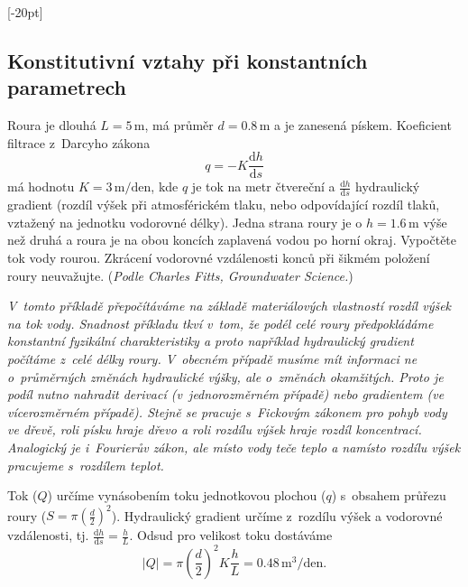 \konec



[-20pt]
\subsection{Konstitutivní vztahy při konstantních parametrech}

Roura je dlouhá $L=5\,\mathrm m$, má průměr $d=0.8\,\mathrm m$ a je zanesená pískem. Koeficient filtrace z Darcyho zákona
\begin{equation*}
  q=-K\frac{\mathrm dh}{\mathrm ds}
\end{equation*}
má hodnotu $K=3\,\mathrm m/\mathrm{den}$, kde $q$ je tok na metr čtvereční a $\frac{\mathrm dh}{\mathrm ds}$ hydraulický gradient (rozdíl výšek při atmosférickém tlaku, nebo odpovídající rozdíl tlaků, vztažený na jednotku vodorovné délky). Jedna strana roury je o $h=1.6\,\mathrm{m}$ výše než druhá a roura je na obou koncích zaplavená vodou po horní okraj. Vypočtěte tok vody rourou. Zkrácení vodorovné vzdálenosti konců při šikmém položení roury neuvažujte.
(\textit{Podle Charles Fitts, Groundwater Science.})


{\textit{V tomto příkladě přepočítáváme na základě materiálových vlastností rozdíl výšek na tok vody. Snadnost příkladu tkví v tom, že podél celé roury předpokládáme konstantní fyzikální charakteristiky a proto například hydraulický gradient počítáme z celé délky roury. V obecném případě musíme mít informaci ne o průměrných změnách hydraulické výšky, ale o změnách okamžitých. Proto je podíl nutno nahradit derivací (v jednorozměrném případě) nebo gradientem (ve vícerozměrném případě). Stejně se pracuje s Fickovým zákonem pro pohyb vody ve dřevě, roli písku hraje dřevo a roli rozdílu výšek hraje rozdíl koncentrací. Analogický je i Fourierův zákon, ale místo vody teče teplo a namísto rozdílu výšek pracujeme s rozdílem teplot.}

}

\reseni
Tok ($Q$) určíme vynásobením toku jednotkovou plochou ($q$) s obsahem průřezu roury ($S=\pi \left(\frac d2\right)^2$). Hydraulický gradient určíme z rozdílu výšek a vodorovné vzdálenosti, tj. $\frac{\mathrm dh}{\mathrm ds}=\frac hL.$ Odsud pro velikost toku dostáváme
$$|Q|= \pi \left(\frac d2\right)^2 K \frac hL=0.48 \,\mathrm{m}^3/\mathrm{den}.$$
\konec




